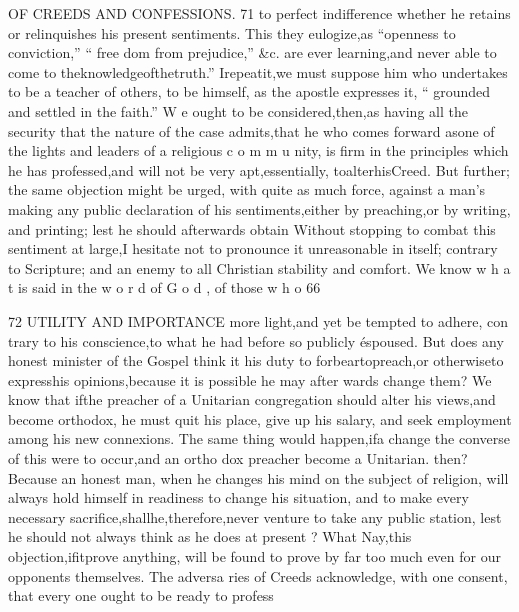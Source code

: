 \documentclass[
]{book}
\begin{document}
OF CREEDS AND CONFESSIONS. 71
to perfect indifference whether he retains or relinquishes his present sentiments. This they eulogize,as ``openness to conviction,'' `` free
dom from prejudice,'' \&c.
are
ever learning,and never able to come to theknowledgeofthetruth.'' Irepeatit,we must suppose him who undertakes to be a teacher of others, to be himself, as the apostle expresses it, `` grounded and settled in the faith.'' W e ought to be considered,then,as having all the security that the nature of the
case admits,that he who comes forward asone of the lights and leaders of a religious c o m m u nity, is firm in the principles which he has professed,and will not be very apt,essentially, toalterhisCreed.
But further; the same objection might be urged, with quite as much force, against a man's making any public declaration of his sentiments,either by preaching,or by writing, and printing; lest he should afterwards obtain
Without stopping to combat this sentiment at large,I hesitate
not to pronounce it unreasonable
in itself;
contrary to Scripture; and an enemy to all
Christian stability and comfort. We know w h a t is said in the w o r d of G o d , of those w h o
66

72
UTILITY AND IMPORTANCE
more light,and yet be tempted to adhere, con trary to his conscience,to what he had before
so publicly éspoused. But does any honest minister of the Gospel think it his duty to forbeartopreach,or otherwiseto expresshis
opinions,because it is possible he may after wards change them? We know that ifthe
preacher of a Unitarian congregation should alter his views,and become orthodox, he must quit his place, give up his salary, and seek employment among his new connexions.
The same thing would happen,ifa change the converse of this were to occur,and an ortho
dox preacher become a Unitarian.
then? Because an honest man, when he changes his mind on the subject of religion,
will always hold himself in readiness to change his situation, and to make every necessary
sacrifice,shallhe,therefore,never venture to take any public station, lest he should not always think as he does at present ?
What
Nay,this objection,ifitprove anything,
will be found to prove by far too much even for our opponents themselves. The adversa ries of Creeds acknowledge, with one consent,
that every one ought to be ready to profess
\end{document}

